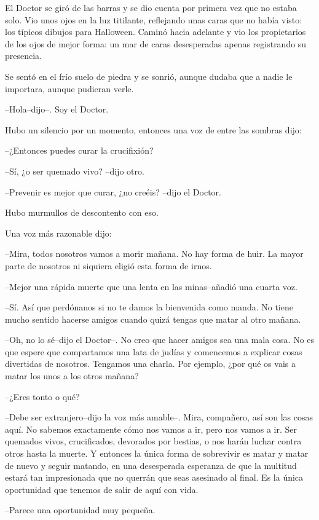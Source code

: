 El Doctor se giró de las barras y se dio cuenta por primera vez que no
estaba solo. Vio unos ojos en la luz titilante, reflejando unas caras
que no había visto: los típicos dibujos para Halloween. Caminó hacia
adelante y vio los propietarios de los ojos de mejor forma: un mar de
caras desesperadas apenas registrando su presencia.

Se sentó en el frío suelo de piedra y se sonrió, aunque dudaba que a
nadie le importara, aunque pudieran verle.

--Hola--dijo--. Soy el Doctor.

Hubo un silencio por un momento, entonces una voz de entre las sombras
dijo:

--¿Entonces puedes curar la crucifixión?

--Sí, ¿o ser quemado vivo? --dijo otro.

--Prevenir es mejor que curar, ¿no creéis? --dijo el Doctor.

Hubo murmullos de descontento con eso.

Una voz más razonable dijo:

--Mira, todos nosotros vamos a morir mañana. No hay forma de huir. La
mayor parte de nosotros ni siquiera eligió esta forma de irnos.

--Mejor una rápida muerte que una lenta en las minas--añadió una cuarta
voz.

--Sí. Así que perdónanos si no te damos la bienvenida como manda. No
tiene mucho sentido hacerse amigos cuando quizá tengas que matar al otro
mañana.

--Oh, no lo sé--dijo el Doctor--. No creo que hacer amigos sea una mala
cosa. No es que espere que compartamos una lata de judías y comencemos a
explicar cosas divertidas de nosotros. Tengamos una charla. Por ejemplo,
¿por qué os vais a matar los unos a los otros mañana?

--¿Eres tonto o qué?

--Debe ser extranjero--dijo la voz más amable--. Mira, compañero, así
son las cosas aquí. No sabemos exactamente cómo nos vamos a ir, pero nos
vamos a ir. Ser quemados vivos, crucificados, devorados por bestias, o
nos harán luchar contra otros hasta la muerte. Y entonces la única forma
de sobrevivir es matar y matar de nuevo y seguir matando, en una
desesperada esperanza de que la multitud estará tan impresionada que no
querrán que seas asesinado al final. Es la única oportunidad que tenemos
de salir de aquí con vida.

--Parece una oportunidad muy pequeña.


